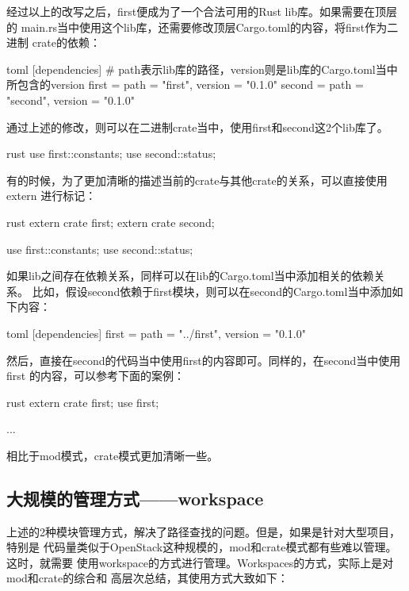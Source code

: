 经过以上的改写之后，first便成为了一个合法可用的Rust lib库。如果需要在顶层的
main.rs当中使用这个lib库，还需要修改顶层Cargo.toml的内容，将first作为二进制
crate的依赖：
\begin{code-block}{toml}
[dependencies]
# path表示lib库的路径，version则是lib库的Cargo.toml当中所包含的version
first = { path = "first", version = "0.1.0" }
second = { path = "second", version = "0.1.0" }
\end{code-block}

通过上述的修改，则可以在二进制crate当中，使用first和second这2个lib库了。
\begin{code-block}{rust}
use first::constants;
use second::status;
\end{code-block}

有的时候，为了更加清晰的描述当前的crate与其他crate的关系，可以直接使用extern
进行标记：
\begin{code-block}{rust}
extern crate first;
extern crate second;

use first::constants;
use second::status;
\end{code-block}

如果lib之间存在依赖关系，同样可以在lib的Cargo.toml当中添加相关的依赖关系。
比如，假设second依赖于first模块，则可以在second的Cargo.toml当中添加如下内容：
\begin{code-block}{toml}
[dependencies]
first = { path = "../first", version = "0.1.0" }
\end{code-block}

然后，直接在second的代码当中使用first的内容即可。同样的，在second当中使用first
的内容，可以参考下面的案例：
\begin{code-block}{rust}
extern crate first;
use first;

...
\end{code-block}

相比于mod模式，crate模式更加清晰一些。

\subsection{大规模的管理方式——workspace}
上述的2种模块管理方式，解决了路径查找的问题。但是，如果是针对大型项目，特别是
代码量类似于OpenStack这种规模的，mod和crate模式都有些难以管理。这时，就需要
使用workspace的方式进行管理。Workspaces的方式，实际上是对mod和crate的综合和
高层次总结，其使用方式大致如下：

